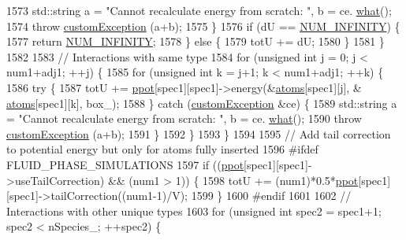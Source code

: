 \begin{DoxyCode}
1573                 std::string a = \textcolor{stringliteral}{"Cannot recalculate energy from scratch: "}, b = ce.
      \hyperlink{classcustom_exception_aeb6ab5848b038adfc68fde86a512f691}{what}();
1574                 \textcolor{keywordflow}{throw} \hyperlink{classcustom_exception}{customException} (a+b);
1575             \}
1576             \textcolor{keywordflow}{if} (dU == \hyperlink{potentials_8h_ab94ab1d09e2291d03fe92a0e24a9d33b}{NUM\_INFINITY}) \{
1577                 \textcolor{keywordflow}{return} \hyperlink{potentials_8h_ab94ab1d09e2291d03fe92a0e24a9d33b}{NUM\_INFINITY};
1578             \} \textcolor{keywordflow}{else} \{
1579                 totU += dU;
1580             \}
1581         \}
1582 
1583         \textcolor{comment}{// Interactions with same type}
1584         \textcolor{keywordflow}{for} (\textcolor{keywordtype}{unsigned} \textcolor{keywordtype}{int} j = 0; j < num1+adj1; ++j) \{
1585             \textcolor{keywordflow}{for} (\textcolor{keywordtype}{unsigned} \textcolor{keywordtype}{int} k = j+1; k < num1+adj1; ++k) \{
1586                 \textcolor{keywordflow}{try} \{
1587                     totU += \hyperlink{classsim_system_ad2e290b5963f132e6a3a56cee35c8e9f}{ppot}[spec1][spec1]->energy(&\hyperlink{classsim_system_a90421b19082f7fb8fc23b7264b1161e4}{atoms}[spec1][j], &
      \hyperlink{classsim_system_a90421b19082f7fb8fc23b7264b1161e4}{atoms}[spec1][k], box\_);
1588                 \} \textcolor{keywordflow}{catch} (\hyperlink{classcustom_exception}{customException} &ce) \{
1589                     std::string a = \textcolor{stringliteral}{"Cannot recalculate energy from scratch: "}, b = ce.
      \hyperlink{classcustom_exception_aeb6ab5848b038adfc68fde86a512f691}{what}();
1590                     \textcolor{keywordflow}{throw} \hyperlink{classcustom_exception}{customException} (a+b);
1591                 \}
1592             \}
1593         \}
1594 
1595         \textcolor{comment}{// Add tail correction to potential energy but only for atoms fully inserted}
1596 \textcolor{preprocessor}{#ifdef FLUID\_PHASE\_SIMULATIONS}
1597 \textcolor{preprocessor}{}        \textcolor{keywordflow}{if} ((\hyperlink{classsim_system_ad2e290b5963f132e6a3a56cee35c8e9f}{ppot}[spec1][spec1]->useTailCorrection) && (num1 > 1)) \{
1598             totU += (num1)*0.5*\hyperlink{classsim_system_ad2e290b5963f132e6a3a56cee35c8e9f}{ppot}[spec1][spec1]->tailCorrection((num1-1)/V);
1599         \}
1600 \textcolor{preprocessor}{#endif}
1601 \textcolor{preprocessor}{}
1602         \textcolor{comment}{// Interactions with other unique types}
1603         \textcolor{keywordflow}{for} (\textcolor{keywordtype}{unsigned} \textcolor{keywordtype}{int} spec2 = spec1+1; spec2 < nSpecies\_; ++spec2) \{

\end{DoxyCode}
